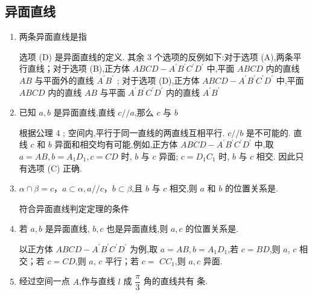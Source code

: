 \subsection*{异面直线}
\begin{enumerate}
    \item 两条异面直线是指
    \begin{jieda}
        选项 (D) 是异面直线的定义. 其余 3 个选项的反例如下:对于选项 (A),两条平行直线；对于选项 (B),正方体 ${ABCD} - {A}^{\prime }{B}^{\prime }{C}^{\prime }{D}^{\prime }$ 中,平面 ${ABCD}$ 内的直线 ${AB}$ 与平面外的直线 ${A}^{\prime }{B}^{\prime }$ ; 对于选项 (D),正方体 ${ABCD} - {A}^{\prime }{B}^{\prime }{C}^{\prime }{D}^{\prime }$ 中,平面 ${ABCD}$ 内的直线 ${AB}$ 与平面 ${A}^{\prime }{B}^{\prime }{C}^{\prime }{D}^{\prime }$ 内的直线 ${A}^{\prime }{B}^{\prime }$
    \end{jieda}
    \item 已知 $a,b$ 是异面直线,直线 $c//a$,那么 $c$ 与 $b$ 
    \begin{jieda}
        根据公理 4 ; 空间内,平行于同一直线的两直线互相平行. $c//b$ 是不可能的. 直线 $c$ 和 $b$ 异面和相交均有可能,例如,正方体 ${ABCD} - {A}^{\prime }{B}^{\prime }{C}^{\prime }{D}^{\prime }$ 中,取 $a = {AB},b = {A}_{1}{D}_{1},c = {CD}$ 时, $b$ 与 $c$ 异面; $c = {D}_{1}{C}_{1}$ 时, $b$ 与 $c$ 相交. 因此只有选项 (C) 正确.
    \end{jieda}
    \item $\alpha  \cap \beta  = c$，$a \subset  \alpha,a//c$，$b \subset  \beta$,且 $b$ 与 $c$ 相交,则 $a$ 和 $b$ 的位置关系是.
    \begin{jieda}
        符合异面直线判定定理的条件
    \end{jieda}
    \item 若 $a,b$ 是异面直线, $b,c$ 也是异面直线,则 $a,c$ 的位置关系是.
    \begin{jieda}
        以正方体 ${ABCD} - {A}^{\prime }{B}^{\prime }{C}^{\prime }{D}^{\prime }$ 为例,取 $a = {AB},b = {A}_{1}{D}_{1}$,若 $c = {BD}$,则 $a$, $c$ 相交；若 $c = {CD}$,则 $a$, $c$ 平行；若 $c =$  $C{C}_{1}$,则 $a,c$ 异面.
    \end{jieda}
    \item 经过空间一点 $A$,作与直线 $l$ 成 $\dfrac{\pi }{3}$ 角的直线共有 条.
    \begin{jieda}

\end{jieda}
\end{enumerate}
